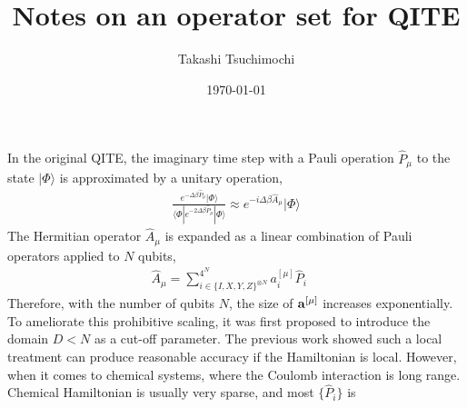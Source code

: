\documentclass[prb,amsmath,amsfonts,amssymb]{revtex4}
\begin{document}
\title{Notes on an operator set for QITE}
\author{Takashi Tsuchimochi}
\date{\today}
\maketitle

In the original QITE, the imaginary time step with a Pauli operation $\hat P_\mu$ to the state $|\Phi\rangle$ is approximated by a unitary operation,
\begin{align}
\frac{e^{-\Delta \beta \hat P_\mu}|\Phi\rangle}{\langle\Phi|e^{-2\Delta \beta \hat P_\mu}|\Phi\rangle}
\approx
e^{- i \Delta \beta \hat A_\mu}|\Phi\rangle
\end{align}
The Hermitian operator $\hat A_\mu$ is expanded as a linear combination of Pauli operators applied to $N$ qubits,
\begin{align}
	\hat A_\mu = \sum_{i\in \{I,X,Y,Z\}^{\otimes N}}^{4^N} a^{[\mu]}_i \hat P_i \;\;\;\; 
\end{align} 
Therefore, with the number of qubits $N$, the size of ${\bf a}^{[\mu]}$ increases exponentially. To ameliorate this prohibitive scaling, it was first proposed to introduce the domain $D < N$ as a cut-off parameter. The previous work showed such a local treatment can produce reasonable accuracy if the Hamiltonian is local. However, when it comes to chemical systems, where the Coulomb interaction is long range. Chemical Hamiltonian is usually very sparse, and most $\{\hat P_i\}$ is 
\end{document}
